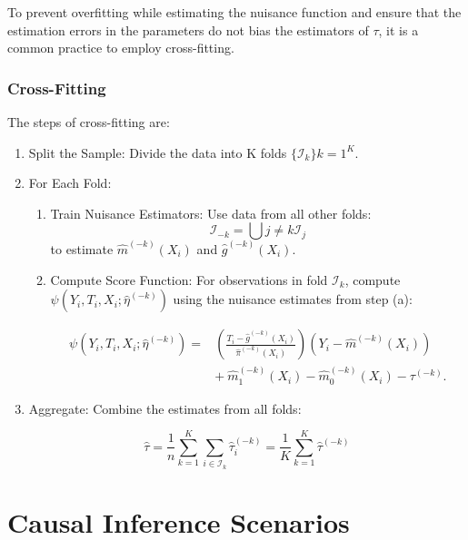 \documentclass{article}
\numberwithin{equation}{section}
\begin{document}
To prevent overfitting while estimating the nuisance function and ensure that the estimation errors in the parameters do not bias the estimators of $\tau$, it is a common practice to employ cross-fitting.

\subsubsection{Cross-Fitting}

The steps of cross-fitting are:

\begin{enumerate}
\item Split the Sample: Divide the data into K folds $\{\mathcal{I}_k\}{k=1}^K$.
\item For Each Fold:
\begin{enumerate}
\item Train Nuisance Estimators: Use data from all other folds:
$$
\mathcal{I}_{-k} = \bigcup{j \neq k} \mathcal{I}_j
$$
to estimate $\hat{m}^{(-k)}(X_i)$ and $\hat{g}^{(-k)}(X_i)$.

\item Compute Score Function: For observations in fold $\mathcal{I}_k$, compute $\psi(Y_i, T_i, X_i; \hat{\eta}^{(-k)})$ using the nuisance estimates from step (a):

\begin{equation}
    \begin{split}
        \psi(Y_i, T_i, X_i; \hat{\eta}^{(-k)}) = & \left( \frac{T_i - \hat{g}^{(-k)}(X_i)}{\hat{\pi}^{(-k)}(X_i)} \right) (Y_i - \hat{m}^{(-k)}(X_i)) \\
        & + \ \hat{m}_1^{(-k)}(X_i) - \hat{m}_0^{(-k)}(X_i) - \tau^{(-k)}.
    \end{split}
    \label{eq:orthogonal_score_fold_k}
\end{equation}

\end{enumerate}
\item Aggregate: Combine the estimates from all folds:

\begin{equation}
\hat{\tau} = \frac{1}{n} \sum_{k=1}^K \sum_{i \in \mathcal{I}_k} \hat{\tau}_i^{(-k)} =  \frac{1}{K} \sum_{k=1}^K \hat{\tau}^{(-k)}
\label{eq:avg_tau_hat}
\end{equation}

\end{enumerate}

\section{Causal Inference Scenarios}
\end{document}
